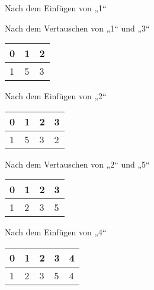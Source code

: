 \documentclass{bschlangaul-aufgabe}
\begin{document}
\begin{enumerate}
\begin{enumerate}
\begin{bBaum}{Nach dem Einfügen von „1“}
\end{bBaum}

\begin{bBaum}{Nach dem Vertauschen von „1“ und „3“}
\begin{tabular}{lll}
\bf{0} & \bf{1} & \bf{2} \\
\hline
1      & 5      & 3      \\
\end{tabular}

\end{bBaum}

\begin{bBaum}{Nach dem Einfügen von „2“}
\begin{tabular}{llll}
\bf{0} & \bf{1} & \bf{2} & \bf{3} \\
\hline
1      & 5      & 3      & 2      \\
\end{tabular}

\end{bBaum}

\begin{bBaum}{Nach dem Vertauschen von „2“ und „5“}
\begin{tabular}{llll}
\bf{0} & \bf{1} & \bf{2} & \bf{3} \\
\hline
1      & 2      & 3      & 5      \\
\end{tabular}

\end{bBaum}

\begin{bBaum}{Nach dem Einfügen von „4“}
\begin{tabular}{lllll}
\bf{0} & \bf{1} & \bf{2} & \bf{3} & \bf{4} \\
\hline
1      & 2      & 3      & 5      & 4      \\
\end{tabular}


\end{bBaum}
\end{enumerate}
\end{enumerate}
\end{document}
